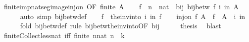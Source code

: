\begin{isabellebody}
\ finite{\isacharunderscore}{\kern0pt}imp{\isacharunderscore}{\kern0pt}nat{\isacharunderscore}{\kern0pt}seg{\isacharunderscore}{\kern0pt}image{\isacharunderscore}{\kern0pt}inj{\isacharunderscore}{\kern0pt}on\ {\isacharbrackleft}{\kern0pt}OF\ {\isacartoucheopen}finite\ A{\isacartoucheclose}{\isacharbrackright}{\kern0pt}\isanewline
\ \ \isamarkupfalse%
\ f\ \ n\ {\isacharcolon}{\kern0pt}{\isacharcolon}{\kern0pt}\ nat\ \ bij{\isacharcolon}{\kern0pt}\ {\isachardoublequoteopen}bij{\isacharunderscore}{\kern0pt}betw\ f\ {\isacharbraceleft}{\kern0pt}i{\isachardot}{\kern0pt}\ i{\isacharless}{\kern0pt}n{\isacharbraceright}{\kern0pt}\ A{\isachardoublequoteclose}\isanewline
\ \ \ \ \isamarkupfalse%
\ {\isacharparenleft}{\kern0pt}auto\ simp{\isacharcolon}{\kern0pt}\ bij{\isacharunderscore}{\kern0pt}betw{\isacharunderscore}{\kern0pt}def{\isacharparenright}{\kern0pt}\isanewline
\ \ \isamarkupfalse%
\ {\isacharquery}{\kern0pt}f\ {\isacharequal}{\kern0pt}\ {\isachardoublequoteopen}the{\isacharunderscore}{\kern0pt}inv{\isacharunderscore}{\kern0pt}into\ {\isacharbraceleft}{\kern0pt}i{\isachardot}{\kern0pt}\ i{\isacharless}{\kern0pt}n{\isacharbraceright}{\kern0pt}\ f{\isachardoublequoteclose}\isanewline
\ \ \isamarkupfalse%
\ {\isachardoublequoteopen}inj{\isacharunderscore}{\kern0pt}on\ {\isacharquery}{\kern0pt}f\ A\ {\isasymand}\ {\isacharquery}{\kern0pt}f\ {\isacharbackquote}{\kern0pt}\ A\ {\isacharequal}{\kern0pt}\ {\isacharbraceleft}{\kern0pt}i{\isachardot}{\kern0pt}\ i{\isacharless}{\kern0pt}n{\isacharbraceright}{\kern0pt}{\isachardoublequoteclose}\isanewline
\ \ \ \ \isamarkupfalse%
\ {\isacharparenleft}{\kern0pt}fold\ bij{\isacharunderscore}{\kern0pt}betw{\isacharunderscore}{\kern0pt}def{\isacharparenright}{\kern0pt}\ {\isacharparenleft}{\kern0pt}rule\ bij{\isacharunderscore}{\kern0pt}betw{\isacharunderscore}{\kern0pt}the{\isacharunderscore}{\kern0pt}inv{\isacharunderscore}{\kern0pt}into{\isacharbrackleft}{\kern0pt}OF\ bij{\isacharbrackright}{\kern0pt}{\isacharparenright}{\kern0pt}\isanewline
\ \ \isamarkupfalse%
\ \isamarkupfalse%
\ {\isacharquery}{\kern0pt}thesis\ \isamarkupfalse%
\ blast\isanewline
{}\isamarkupfalse%
%
\endisatagproof
{\isafoldproof}%
%
\isadelimproof
\isanewline
%
\endisadelimproof
\isanewline
{}\isamarkupfalse%
\ finite{\isacharunderscore}{\kern0pt}Collect{\isacharunderscore}{\kern0pt}less{\isacharunderscore}{\kern0pt}nat\ {\isacharbrackleft}{\kern0pt}iff{\isacharbrackright}{\kern0pt}{\isacharcolon}{\kern0pt}\ {\isachardoublequoteopen}finite\ {\isacharbraceleft}{\kern0pt}n{\isacharcolon}{\kern0pt}{\isacharcolon}{\kern0pt}nat{\isachardot}{\kern0pt}\ n\ {\isacharless}{\kern0pt}\ k{\isacharbraceright}{\kern0pt}{\isachardoublequoteclose}\isanewline

\end{isabellebody}
